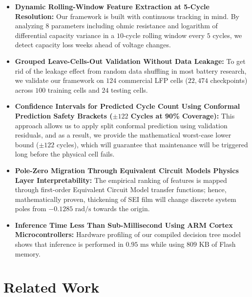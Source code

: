 \documentclass[pdflatex,sn-mathphys-num]{sn-jnl}%
\theoremstyle{thmstyleone}%
\theoremstyle{thmstyletwo}%
\theoremstyle{thmstylethree}%
\begin{document}
\begin{itemize}
    \item \textbf{Dynamic Rolling-Window Feature Extraction at 5-Cycle Resolution:} Our framework is built with continuous tracking in mind. By analyzing $8$ parameters including ohmic resistance and logarithm of differential capacity variance in a $10$-cycle rolling window every $5$ cycles, we detect capacity loss weeks ahead of voltage changes.

    \item \textbf{Grouped Leave-Cells-Out Validation Without Data Leakage:} To get rid of the leakage effect from random data shuffling in most battery research, we validate our framework on $124$ commercial LFP cells ($22,474$ checkpoints) across $100$ training cells and $24$ testing cells.

    \item \textbf{Confidence Intervals for Predicted Cycle Count Using Conformal Prediction Safety Brackets ($\pm 122$ Cycles at 90\% Coverage):} This approach allows us to apply split conformal prediction using validation residuals, and as a result, we provide the mathematical worst-case lower bound ($\pm 122$ cycles), which will guarantee that maintenance will be triggered long before the physical cell fails.

    \item \textbf{Pole-Zero Migration Through Equivalent Circuit Models Physics Layer Interpretability:} The empirical ranking of features is mapped through first-order Equivalent Circuit Model transfer functions; hence, mathematically proven, thickening of SEI film will change discrete system poles from $-0.1285\text{ rad/s}$ towards the origin.

    \item \textbf{Inference Time Less Than Sub-Millisecond Using ARM Cortex Microcontrollers:} Hardware profiling of our compiled decision tree model shows that inference is performed in $0.95\text{ ms}$ while using $809\text{ KB}$ of Flash memory.
\end{itemize}


\section{Related Work}\label{sec2}
\end{document}
